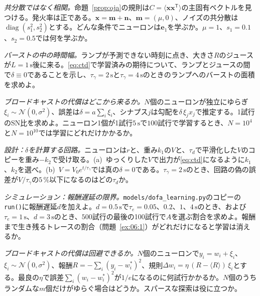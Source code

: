 \begin{exercise}[\lvlB]
\label{ex:06:3}
\emph{共分散ではなく相関。}命題~\ref{prop:oja}の規則は$C=\langle\mathbf x\mathbf x^{\mathsf T}\rangle$の主固有ベクトルを見つける。発火率は正である。$\mathbf x=\mathbf m+\mathbf n$、$\mathbf m=(\mu,0)$、ノイズの共分散は$\operatorname{diag}(s_1^2,s_2^2)$とする。どんな条件でニューロンは$\mathbf e_1$を学ぶか。$\mu=1$、$s_1=0.1$、$s_2=0.5$では何を学ぶか。
\end{exercise}

\begin{exercise}[\lvlA]
\label{ex:06:4}
\emph{バーストの中の時間幅。}ランプが予測できない時刻に点き、大きさ$R$のジュースが$L=1\,\text{s}$後に来る。\eqref{eq:ctd}で学習済みの期待について、ランプとジュースの間で$\delta\equiv0$であることを示し、$\tau_\gamma=2\,\text{s}$と$\tau_\gamma=4\,\text{s}$のときのランプへのバーストの面積を求めよ。
\end{exercise}

\begin{exercise}[\lvlB]
\label{ex:06:5}
\emph{ブロードキャストの代償はどこから来るか。}$N$個のニューロンが独立にゆらぎ$\xi_i\sim\mathcal N(0,\sigma^2)$、誤差は$\delta=a\sum_i\xi_i$、シナプス$j$は勾配を$\delta\,\xi_jx_j$で推定する。1試行のSN比を求めよ。ニューロン1個が1試行$5\,\text{s}$で$100$試行で学習するとき、$N=10^4$と$N=10^{10}$では学習にどれだけかかるか。
\end{exercise}

\begin{exercise}[\lvlB]
\label{ex:06:6}
\emph{設計：$\delta$を計算する回路。}ニューロンは$r$と、重み$k_1$の$V$と、$\tau_d$で平滑化した$V$のコピーを重み$-k_2$で受け取る。(a)~ゆっくりした$V$で出力が\eqref{eq:ctd}になるように$k_1$、$k_2$を選べ。(b)~$V=V_0e^{t/\tau_\gamma}$では真の$\delta=0$である。$\tau_\gamma=2\,\text{s}$のとき、回路の偽の誤差が$V/\tau_\gamma$の$5\,\%$以下になるのはどの$\tau_d$か。
\end{exercise}

\begin{exercise}[\lvlB]
\label{ex:06:7}
\emph{シミュレーション：報酬遅延の限界。}\texttt{models/\allowbreak dofa\_learning.py}のコピーの\texttt{run()}に報酬遅延$d$を加えよ。$d=0.5\,\text{s}$で$\tau_e=0.05$、$0.2$、$1$、$4\,\text{s}$のとき、および$\tau_e=1\,\text{s}$、$d=3\,\text{s}$のとき、$500$試行の最後の100試行で$A$を選ぶ割合を求めよ。報酬まで生き残るトレースの割合（問題~\ref{ex:06:1}）がどれだけになると学習は消えるか。
\end{exercise}

\begin{exercise}[\lvlC]
\label{ex:06:8}
\emph{ブロードキャストの代償は回避できるか。}$N$個のニューロンで$y_i=w_i+\xi_i$、$\xi_i\sim\mathcal N(0,\sigma^2)$、報酬$R=-\sum_i(y_i-w_i^*)^2$、規則$\Delta w_i=\eta\,(R-\langle R\rangle)\,\xi_i$とする。最良の$\eta$で誤差$\sum_i(w_i-w_i^*)^2$が$1/e$になるのに何試行かかるか。$N$個のうちランダムな$m$個だけがゆらぐ場合はどうか。スパースな探索は役に立つか。
\end{exercise}
